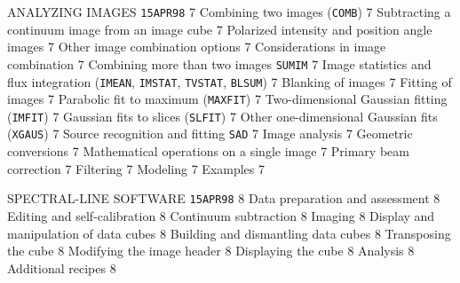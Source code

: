      {ANALYZING IMAGES%
}                    {{\tt 15APR98}\hskip 0.6cm 7}
   {Combining two images ({\tt COMB})}           {7}
 {Subtracting a continuum image from an image
                      cube}                                   {7}
 {Polarized intensity and position angle images} {7}
 {Other image combination options}             {7}
 {Considerations in image combination}         {7}
   {Combining more than two images {\tt SUMIM}}  {7}
   {Image statistics and flux integration
                     ({\tt IMEAN}, {\tt IMSTAT}, {\tt TVSTAT},
                     {\tt BLSUM})}                            {7}
   {Blanking of images}                          {7}
   {Fitting of images}                           {7}
 {Parabolic fit to maximum ({\tt MAXFIT})}     {7}
 {Two-dimensional Gaussian fitting
                     ({\tt IMFIT})}                           {7}
 {Gaussian fits to slices ({\tt SLFIT})}       {7}
 {Other one-dimensional Gaussian fits
                     ({\tt XGAUS})}                           {7}
 {Source recognition and fitting {\tt SAD}}    {7}
   {Image analysis}                              {7}
 {Geometric conversions}                       {7}
 {Mathematical operations on a single image}   {7}
 {Primary beam correction}                     {7}
 {Filtering}                                   {7}
 {Modeling}                                    {7}
 {Examples}                                    {7}

     {SPECTRAL-LINE SOFTWARE%
}                    {{\tt 15APR98}\hskip 0.6cm 8}
   {Data preparation and assessment}             {8}
   {Editing and self-calibration}                {8}
   {Continuum subtraction}                       {8}
   {Imaging}                                     {8}
   {Display and manipulation of data cubes}      {8}
 {Building and dismantling data cubes}         {8}
 {Transposing the cube}                        {8}
 {Modifying the image header}                  {8}
 {Displaying the cube}                         {8}
   {Analysis}                                    {8}
   {Additional recipes}                          {8}

